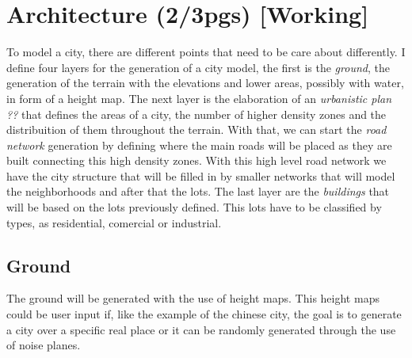 
% 
% 

\section{Architecture (2/3pgs)  [Working]}
\label{sec:architecture}


To model a city, there are different points that need to be care about differently. I define four layers for the generation of a city model, the first is the \emph{ground}, the generation of the terrain with the elevations and lower areas, possibly with water, in form of a height map. The next layer is the elaboration of an \emph{urbanistic plan ??} that defines the areas of a city, the number of higher density zones and the distribuition of them throughout the terrain. With that, we can start the \emph{road network} generation by defining where the main roads will be placed as they are built connecting this high density zones. With this high level road network we have the city structure that will be filled in by smaller networks that will model the neighborhoods and after that the lots. The last layer are the \emph{buildings} that will be based on the lots previously defined. This lots have to be classified by types, as residential, comercial or industrial.


\subsection{Ground} %
\label{sub:ground}
The ground will be generated with the use of height maps. This height maps could be user input if, like the example of the chinese city, the goal is to generate a city over a specific real place or it can be randomly generated through the use of noise planes.

